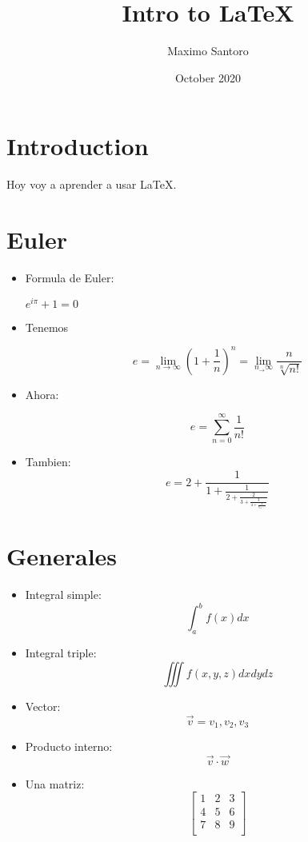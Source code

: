 \documentclass{article}
\title{Intro to \LaTeX}
\author{Maximo Santoro}
\date{October 2020}
\begin{document}
\maketitle

\section{Introduction}
Hoy voy a aprender a usar \LaTeX.

\section{Euler}
\begin{itemize}

\item Formula de Euler: 

$e^{i\pi}+1 = 0$

\item Tenemos 

$$ e= \lim_{n\to\infty} \left(1+\frac{1}{n}\right)^n  =  
\lim_{n_\to\infty}\frac{n}{\sqrt[n]{n!}}$$

\item Ahora:

$$e=\sum_{n=0}^{\infty} \frac{1}{n!}$$

\item Tambien:
$$ e=2+\frac{1}{1+\frac{1}{2+\frac{2}{3+\frac{3}{4+\frac{4}{5+\ddots}}}}} $$
\end{itemize}

\section{Generales}

\begin{itemize}

\item Integral simple:
$$\int_a^bf(x)dx$$

\item Integral triple:
$$\iiint f(x,y,z)dxdydz$$

\item Vector:
$$\vec{v}={v_1, v_2, v_3}$$

\item Producto interno:
$$\vec{v}\cdot \vec{w}$$

\item Una matriz:
$$\begin{bmatrix}
1 & 2 & 3\\
4 & 5 & 6\\
7 & 8 & 9\\
\end{bmatrix}
$$

\end{itemize}
\end{document}
